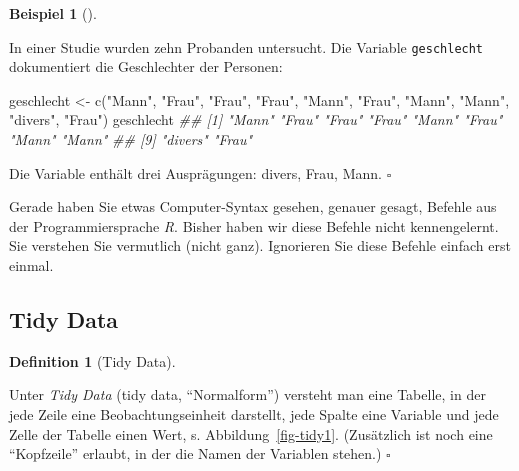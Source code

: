 \documentclass[
  letterpaper,
  twoside,
  open=any]{scrbook}
\newenvironment{Shaded}{\begin{snugshade}}{\end{snugshade}}
\newcommand{\DocumentationTok}[1]{\textcolor[rgb]{0.37,0.37,0.37}{\textit{#1}}}
\newcommand{\FunctionTok}[1]{\textcolor[rgb]{0.28,0.35,0.67}{#1}}
\newcommand{\NormalTok}[1]{\textcolor[rgb]{0.00,0.23,0.31}{#1}}
\newcommand{\OtherTok}[1]{\textcolor[rgb]{0.00,0.23,0.31}{#1}}
\newcommand{\StringTok}[1]{\textcolor[rgb]{0.13,0.47,0.30}{#1}}
\theoremstyle{definition}
\theoremstyle{definition}
\newtheorem{example}{Beispiel}[chapter]
\theoremstyle{definition}
\newtheorem{definition}{Definition}[chapter]
\theoremstyle{remark}
\begin{document}
\begin{example}[]\protect\hypertarget{exm-geschlecht}{}\label{exm-geschlecht}

In einer Studie wurden zehn Probanden untersucht. Die Variable
\texttt{geschlecht} dokumentiert die Geschlechter der Personen:

\begin{Shaded}
\begin{Highlighting}[]
\NormalTok{geschlecht }\OtherTok{\textless{}{-}} \FunctionTok{c}\NormalTok{(}\StringTok{"Mann"}\NormalTok{, }\StringTok{"Frau"}\NormalTok{, }\StringTok{"Frau"}\NormalTok{, }\StringTok{"Frau"}\NormalTok{, }\StringTok{"Mann"}\NormalTok{,}
                \StringTok{"Frau"}\NormalTok{, }\StringTok{"Mann"}\NormalTok{, }\StringTok{"Mann"}\NormalTok{, }\StringTok{"divers"}\NormalTok{, }\StringTok{"Frau"}\NormalTok{)}
\NormalTok{geschlecht}
\DocumentationTok{\#\#  [1] "Mann"   "Frau"   "Frau"   "Frau"   "Mann"   "Frau"   "Mann"   "Mann"  }
\DocumentationTok{\#\#  [9] "divers" "Frau"}
\end{Highlighting}
\end{Shaded}

Die Variable enthält drei Ausprägungen: divers, Frau, Mann. \(\square\)

\end{example}

\begin{tcolorbox}[enhanced jigsaw, colframe=quarto-callout-tip-color-frame, arc=.35mm, leftrule=.75mm, bottomtitle=1mm, titlerule=0mm, colbacktitle=quarto-callout-tip-color!10!white, breakable, bottomrule=.15mm, colback=white, left=2mm, rightrule=.15mm, opacityback=0, toptitle=1mm, toprule=.15mm, opacitybacktitle=0.6, title=\textcolor{quarto-callout-tip-color}{\faLightbulb}\hspace{0.5em}{Tipp}, coltitle=black]

Gerade haben Sie etwas Computer-Syntax gesehen, genauer gesagt, Befehle
aus der Programmiersprache \emph{R}. Bisher haben wir diese Befehle
nicht kennengelernt. Sie verstehen Sie vermutlich (nicht ganz).
Ignorieren Sie diese Befehle einfach erst einmal.

\end{tcolorbox}

\subsection{Tidy Data}\label{tidy-data}

\begin{definition}[Tidy
Data]\protect\hypertarget{def-tidy}{}\label{def-tidy}

Unter \emph{Tidy Data} (tidy data, \enquote{Normalform}) versteht man
eine Tabelle, in der jede Zeile eine Beobachtungseinheit darstellt, jede
Spalte eine Variable und jede Zelle der Tabelle einen Wert, s.
Abbildung~\ref{fig-tidy1}. (Zusätzlich ist noch eine \enquote{Kopfzeile}
erlaubt, in der die Namen der Variablen stehen.) \(\square\)

\end{definition}
\end{document}
